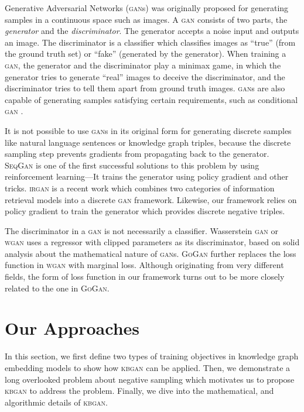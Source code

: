 \documentclass[11pt,a4paper]{article}
\begin{document}
Generative Adversarial Networks (\textsc{gan}s) \cite{goodfellow2014generative} was originally proposed for generating samples in a continuous space such as images. A \textsc{gan} consists of two parts, the \emph{generator} and the \emph{discriminator}. The generator accepts a noise input and outputs an image. The discriminator is a classifier which classifies images as ``true'' (from the ground truth set) or ``fake'' (generated by the generator). When training a \textsc{gan}, the generator and the discriminator play a minimax game, in which the generator tries to generate ``real'' images to deceive the discriminator, and the discriminator tries to tell them apart from ground truth images. \textsc{gan}s are also capable of generating samples satisfying certain requirements, such as conditional \textsc{gan} \cite{conditionalgan}.

It is not possible to use \textsc{gan}s in its original form for generating discrete samples like natural language sentences or knowledge graph triples, because the discrete sampling step prevents gradients from propagating back to the generator. \textsc{SeqGan} \cite{seqgan} is one of the first successful solutions to this problem by using reinforcement learning---It trains the generator using policy gradient and other tricks. \textsc{irgan} \cite{irgan} is a recent work which combines two categories of information retrieval models into a discrete \textsc{gan} framework. Likewise, our framework relies on policy gradient to train the generator which provides discrete negative triples.

The discriminator in a \textsc{gan} is not necessarily a classifier. Wasserstein \textsc{gan} or \textsc{wgan} \cite{wgan} uses a regressor with clipped parameters as its discriminator, based on solid analysis about the mathematical nature of \textsc{gan}s. \textsc{GoGan} \cite{gogan} further replaces the loss function in \textsc{wgan} with marginal loss. Although originating from very different fields, the form of loss function in our framework turns out to be more closely related to the one in \textsc{GoGan}.

\section{Our Approaches}
In this section, we first define two types of training objectives in knowledge graph embedding models to show how \textsc{kbgan} can be applied. Then, we demonstrate a long overlooked problem about negative sampling which motivates us to propose \textsc{kbgan} to address the problem. Finally, we dive into the mathematical, and algorithmic details of \textsc{kbgan}.
\end{document}
